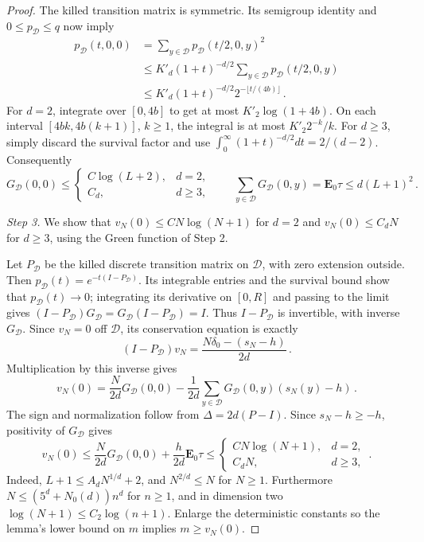 \documentclass[12pt]{amsart}
\begin{document}
\begin{proof}
The killed transition matrix is symmetric. Its semigroup identity and $0\leq p_{\mathcal D}\leq q$ now imply
\begin{equation*}
 \begin{aligned}
 p_{\mathcal D}(t,0,0)&=\sum_{y\in\mathcal D}p_{\mathcal D}(t/2,0,y)^2\\
 &\leq K'_d(1+t)^{-d/2}\sum_{y\in\mathcal D}p_{\mathcal D}(t/2,0,y)\\
 &\leq K'_d(1+t)^{-d/2}2^{-\lfloor t/(4b)\rfloor}\,.
 \end{aligned}
\end{equation*}
For $d=2$, integrate over $[0,4b]$ to get at most $K'_2\log(1+4b)$. On each interval $[4bk,4b(k+1)]$, $k\geq1$, the integral is at most $K'_2 2^{-k}/k$. For $d\geq3$, simply discard the survival factor and use $\int_0^\infty(1+t)^{-d/2}dt=2/(d-2)$. Consequently
\begin{equation*}
 G_{\mathcal D}(0,0)\leq
 \begin{cases}
 C\log(L+2),&d=2,\\
 C_d,&d\geq3,
 \end{cases}
 \qquad \sum_{y\in\mathcal D}G_{\mathcal D}(0,y)=\mathbf E_0\tau\leq d(L+1)^2\,.
\end{equation*}

\emph{Step 3.} We show that $v_N(0)\leq CN\log(N+1)$ for $d=2$ and $v_N(0)\leq C_dN$ for $d\geq3$, using the Green function of Step 2.

Let $P_{\mathcal D}$ be the killed discrete transition matrix on $\mathcal D$, with zero extension outside. Then $p_{\mathcal D}(t)=e^{-t(I-P_{\mathcal D})}$. Its integrable entries and the survival bound show that $p_{\mathcal D}(t)\to0$; integrating its derivative on $[0,R]$ and passing to the limit gives $(I-P_{\mathcal D})G_{\mathcal D}=G_{\mathcal D}(I-P_{\mathcal D})=I$. Thus $I-P_{\mathcal D}$ is invertible, with inverse $G_{\mathcal D}$. Since $v_N=0$ off $\mathcal D$, its conservation equation is exactly
\begin{equation*}
 (I-P_{\mathcal D})v_N=\frac{N\delta_0-(s_N-h)}{2d}\,.
\end{equation*}
Multiplication by this inverse gives
\begin{equation*}
 v_N(0)=\frac{N}{2d}G_{\mathcal D}(0,0)
       -\frac1{2d}\sum_{y\in\mathcal D}G_{\mathcal D}(0,y)(s_N(y)-h)\,.
\end{equation*}
The sign and normalization follow from $\Delta=2d(P-I)$. Since $s_N-h\geq-h$, positivity of $G_{\mathcal D}$ gives
\begin{equation*}
 v_N(0)\leq\frac{N}{2d}G_{\mathcal D}(0,0)+\frac{h}{2d}\mathbf E_0\tau
 \leq\begin{cases}
 C N\log(N+1),&d=2,\\
 C_d N,&d\geq3,
 \end{cases}\,.
\end{equation*}
Indeed, $L+1\leq A_dN^{1/d}+2$, and $N^{2/d}\leq N$ for $N\geq1$. Furthermore $N\leq(5^d+N_0(d))n^d$ for $n\geq1$, and in dimension two $\log(N+1)\leq C_2\log(n+1)$. Enlarge the deterministic constants so the lemma's lower bound on $m$ implies $m\geq v_N(0)$.


\end{proof}
\end{document}
